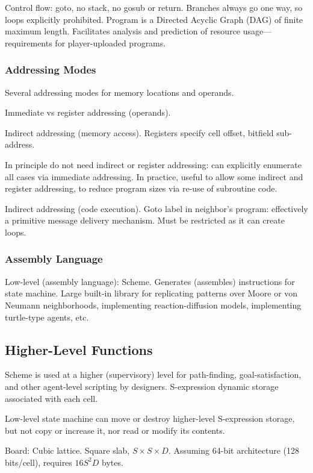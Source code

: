 \documentclass{acm_proc_article-sp}
\begin{document}
Control flow: goto, no stack, no gosub or return.
Branches always go one way, so loops explicitly prohibited.
Program is a Directed Acyclic Graph (DAG) of finite maximum length.
Facilitates analysis and prediction of resource usage---requirements for player-uploaded programs.

\subsubsection{Addressing Modes}

Several addressing modes for memory locations and operands.

Immediate vs register addressing (operands).

Indirect addressing (memory access). Registers specify cell offset, bitfield sub-address.

In principle do not need indirect or register addressing: can explicitly enumerate all cases via immediate addressing.
In practice, useful to allow some indirect and register addressing, to reduce program sizes via re-use of subroutine code.

Indirect addressing (code execution).
Goto label in neighbor's program: effectively a primitive message delivery mechanism.
Must be restricted as it can create loops.

\subsubsection{Assembly Language}

Low-level (assembly language):
Scheme. Generates (assembles) instructions for state machine.
Large built-in library for replicating patterns over Moore or von Neumann neighborhoods,
implementing reaction-diffusion models, implementing turtle-type agents, etc.

\subsection{Higher-Level Functions}

Scheme is used at a higher (supervisory) level for path-finding, goal-satisfaction, and other agent-level scripting by designers.
S-expression dynamic storage associated with each cell.

Low-level state machine can move or destroy higher-level S-expression storage, but not copy or increase it, nor read or modify its contents.

Board:
Cubic lattice.
Square slab, $S \times S \times D$.
Assuming 64-bit architecture (128 bits/cell), requires $16S^2 D$ bytes.
\end{document}
